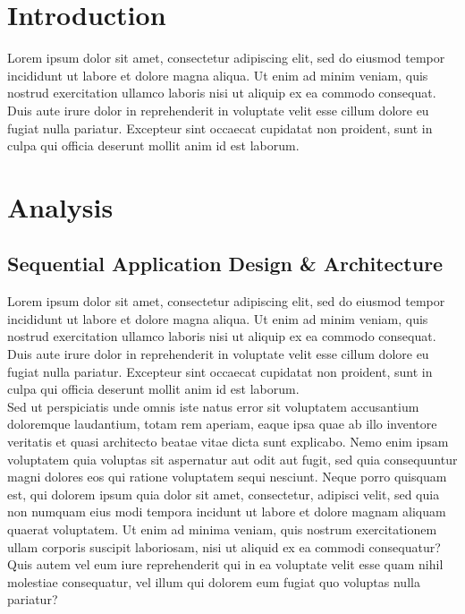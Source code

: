 \documentclass[a4paper,12pt]{article}
\theoremstyle{mytheor}
\begin{document}
    \thispagestyle{title page}
    \newpage
        \pagebreak
    \tableofcontents
        \pagebreak
    \section{Introduction}
        Lorem ipsum dolor sit amet, consectetur adipiscing elit, sed do eiusmod tempor incididunt ut labore et dolore magna aliqua. Ut enim ad minim veniam, quis nostrud exercitation ullamco laboris nisi ut aliquip ex ea commodo consequat. Duis aute irure dolor in reprehenderit in voluptate velit esse cillum dolore eu fugiat nulla pariatur. Excepteur sint occaecat cupidatat non proident, sunt in culpa qui officia deserunt mollit anim id est laborum.
    \section{Analysis}
        \subsection{Sequential Application Design \& Architecture}
            Lorem ipsum dolor sit amet, consectetur adipiscing elit, sed do eiusmod tempor incididunt ut labore et dolore magna aliqua. Ut enim ad minim veniam, quis nostrud exercitation ullamco laboris nisi ut aliquip ex ea commodo consequat. Duis aute irure dolor in reprehenderit in voluptate velit esse cillum dolore eu fugiat nulla pariatur. Excepteur sint occaecat cupidatat non proident, sunt in culpa qui officia deserunt mollit anim id est laborum.\\
            
            \noindent Sed ut perspiciatis unde omnis iste natus error sit voluptatem accusantium doloremque laudantium, totam rem aperiam, eaque ipsa quae ab illo inventore veritatis et quasi architecto beatae vitae dicta sunt explicabo. Nemo enim ipsam voluptatem quia voluptas sit aspernatur aut odit aut fugit, sed quia consequuntur magni dolores eos qui ratione voluptatem sequi nesciunt. Neque porro quisquam est, qui dolorem ipsum quia dolor sit amet, consectetur, adipisci velit, sed quia non numquam eius modi tempora incidunt ut labore et dolore magnam aliquam quaerat voluptatem. Ut enim ad minima veniam, quis nostrum exercitationem ullam corporis suscipit laboriosam, nisi ut aliquid ex ea commodi consequatur? Quis autem vel eum iure reprehenderit qui in ea voluptate velit esse quam nihil molestiae consequatur, vel illum qui dolorem eum fugiat quo voluptas nulla pariatur?
    \pagebreak
\end{document}
